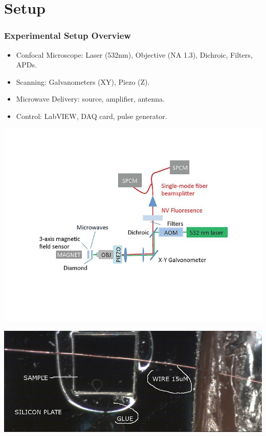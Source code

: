 \section{Setup}

\begin{frame}
\frametitle{Experimental Setup Overview}
\begin{itemize}
    \item Confocal Microscope: Laser (532nm), Objective (NA 1.3), Dichroic, Filters, APDs.
    \item Scanning: Galvanometers (XY), Piezo (Z).
    \item Microwave Delivery: source, amplifier, antenna. 
    \item Control: LabVIEW, DAQ card, pulse generator. 
\end{itemize}

    \begin{minipage}{0.48\textwidth}
        \centering
        \includegraphics[width=\linewidth]{presentation/figs/exptsetup.jpg}
   
    \end{minipage}
    \hfill
    \begin{minipage}{0.48\textwidth}
        \centering
        \includegraphics[width=\linewidth]{presentation/figs/sample.jpg}
       
    \end{minipage}

\end{frame}

